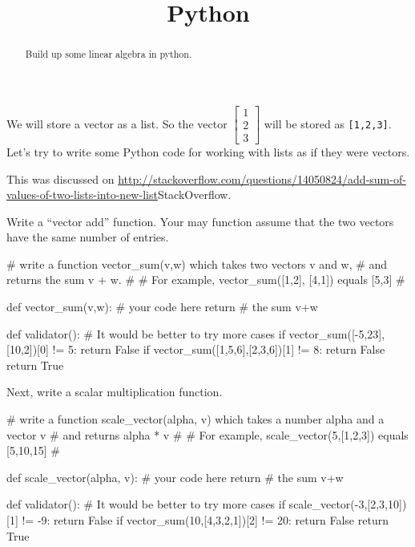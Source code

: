 \documentclass{ximera}
\title{Python}
\begin{document}
\begin{abstract}
  Build up some linear algebra in python.
\end{abstract}

\begin{exercise}
  We will store a vector as a list.  So the vector $\begin{bmatrix} 1 \\
    2 \\ 3\end{bmatrix}$ will be stored as \verb|[1,2,3]|.  Let's try
  to write some Python code for working with lists as if they were
  vectors.

\begin{solution}
  \begin{hint}
    This was discussed on \url{http://stackoverflow.com/questions/14050824/add-sum-of-values-of-two-lists-into-new-list}{StackOverflow}.
  \end{hint}

  Write a ``vector add'' function.  Your may function assume that the
  two vectors have the same number of entries.

\begin{python}
# write a function vector_sum(v,w) which takes two vectors v and w,
# and returns the sum v + w.
#
# For example, vector_sum([1,2], [4,1]) equals [5,3]
#
		
def vector_sum(v,w):
  # your code here
  return # the sum v+w

def validator():
  # It would be better to try more cases
  if vector_sum([-5,23],[10,2])[0] != 5:
    return False
  if vector_sum([1,5,6],[2,3,6])[1] != 8:
    return False
  return True

\end{python}
\end{solution}

Next, write a scalar multiplication function.

\begin{solution}
\begin{python}
# write a function scale_vector(alpha, v) which takes a number alpha and a vector v
# and returns alpha * v
#
# For example, scale_vector(5,[1,2,3]) equals [5,10,15]
#
		
def scale_vector(alpha, v):
  # your code here
  return # the sum v+w

def validator():
  # It would be better to try more cases
  if scale_vector(-3,[2,3,10])[1] != -9:
    return False
  if vector_sum(10,[4,3,2,1])[2] != 20:
    return False
  return True


\end{python}
\end{solution}
\end{exercise}
\end{document}
